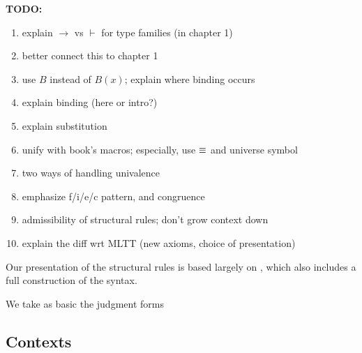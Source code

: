 \let\syn\mathsf

\textbf{TODO:} 
\begin{enumerate}
\item explain $\to$ vs $\vdash$ for type families (in chapter 1)
\item better connect this to chapter 1
\item use $B$ instead of $B(x)$; explain where binding occurs
\item explain binding (here or intro?)
\item explain substitution
\item unify with book's macros; especially, use $\equiv$ and universe symbol
\item two ways of handling univalence
\item emphasize f/i/e/c pattern, and congruence
\item admissibility of structural rules; don't grow context down
\item explain the diff wrt MLTT (new axioms, choice of presentation)
\end{enumerate}


Our presentation of the structural rules is based largely on
\cite{hofmann:syntax-and-semantics}, which also includes a full construction of
the syntax.  

We take as basic the judgment forms

\subsection{Contexts}


